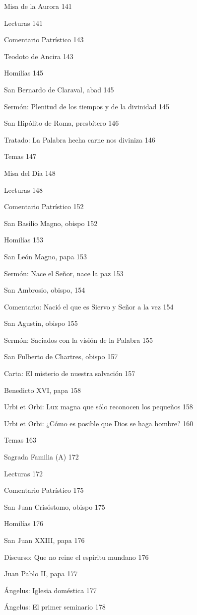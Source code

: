 \documentclass[]{article}
\begin{document}
Misa de la Aurora 141

Lecturas 141

Comentario Patrístico 143

Teodoto de Ancira 143

Homilías 145

San Bernardo de Claraval, abad 145

Sermón: Plenitud de los tiempos y de la divinidad 145

San Hipólito de Roma, presbítero 146

Tratado: La Palabra hecha carne nos diviniza 146

Temas 147

Misa del Día 148

Lecturas 148

Comentario Patrístico 152

San Basilio Magno, obispo 152

Homilías 153

San León Magno, papa 153

Sermón: Nace el Señor, nace la paz 153

San Ambrosio, obispo, 154

Comentario: Nació el que es Siervo y Señor a la vez 154

San Agustín, obispo 155

Sermón: Saciados con la visión de la Palabra 155

San Fulberto de Chartres, obispo 157

Carta: El misterio de nuestra salvación 157

Benedicto XVI, papa 158

Urbi et Orbi: Lux magna que sólo reconocen los pequeños 158

Urbi et Orbi: ¿Cómo es posible que Dios se haga hombre? 160

Temas 163

Sagrada Familia (A) 172

Lecturas 172

Comentario Patrístico 175

San Juan Crisóstomo, obispo 175

Homilías 176

San Juan XXIII, papa 176

Discurso: Que no reine el espíritu mundano 176

Juan Pablo II, papa 177

Ángelus: Iglesia doméstica 177

Ángelus: El primer seminario 178
\end{document}

